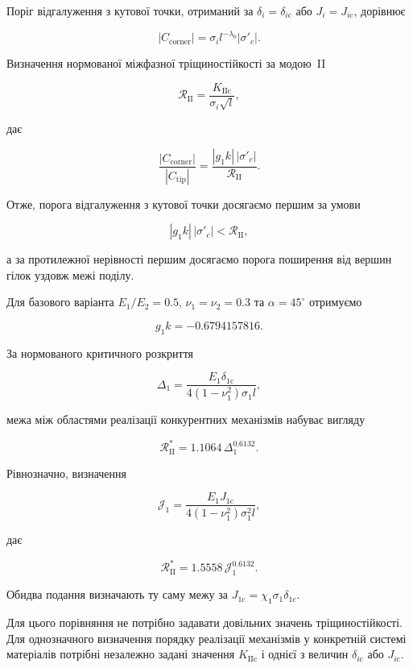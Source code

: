 \documentclass[11pt]{article}
\begin{document}
Поріг відгалуження з кутової точки, отриманий за \(\delta_i=\delta_{i\mathrm{c}}\) або \(J_i=J_{i\mathrm{c}}\), дорівнює

\[
|C_{\mathrm{corner}}|
=
\sigma_i l^{-\lambda_0}|\sigma'_c|.
\]

Визначення нормованої міжфазної тріщиностійкості за модою~II

\[
\mathcal R_{\mathrm{II}}
=
\frac{K_{\mathrm{IIc}}}{\sigma_i\sqrt l},
\]

дає

\[
\boxed{
\frac{|C_{\mathrm{corner}}|}{|C_{\mathrm{tip}}|}
=
\frac{|g_1k|\,|\sigma'_c|}
{\mathcal R_{\mathrm{II}}}
}.
\]

Отже, порога відгалуження з кутової точки досягаємо першим за умови

\[
|g_1k|\,|\sigma'_c|<\mathcal R_{\mathrm{II}},
\]

а за протилежної нерівності першим досягаємо порога поширення від вершин гілок уздовж межі поділу.

Для базового варіанта \(E_1/E_2=0.5\), \(\nu_1=\nu_2=0.3\) та \(\alpha=45^\circ\) отримуємо

\[
g_1k=-0.6794157816.
\]

За нормованого критичного розкриття

\[
\Delta_1=
\frac{E_1\delta_{1\mathrm{c}}}
{4(1-\nu_1^2)\sigma_1l},
\]

межа між областями реалізації конкурентних механізмів набуває вигляду

\[
\mathcal R_{\mathrm{II}}^*
=
1.1064\,\Delta_1^{0.6132}.
\]

Рівнозначно, визначення

\[
\mathcal J_1=
\frac{E_1J_{1\mathrm{c}}}
{4(1-\nu_1^2)\sigma_1^2l},
\]

дає

\[
\mathcal R_{\mathrm{II}}^*
=
1.5558\,\mathcal J_1^{0.6132}.
\]

Обидва подання визначають ту саму межу за \(J_{1\mathrm{c}}=\chi_1\sigma_1\delta_{1\mathrm{c}}\).

Для цього порівняння не потрібно задавати довільних значень тріщиностійкості. Для однозначного визначення порядку реалізації механізмів у конкретній системі матеріалів потрібні незалежно задані значення \(K_{\mathrm{IIc}}\) і однієї з величин \(\delta_{i\mathrm{c}}\) або \(J_{i\mathrm{c}}\).
\end{document}
